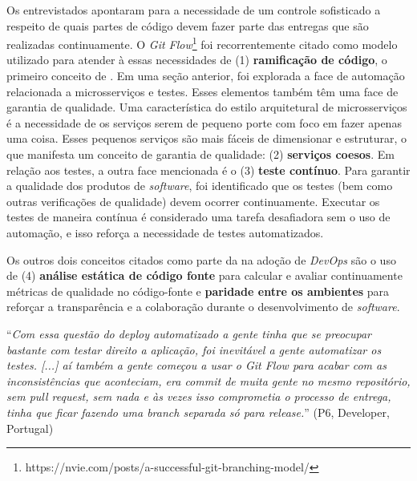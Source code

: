 Os entrevistados apontaram para a necessidade de um controle sofisticado a
respeito de quais partes de código devem fazer parte das entregas que são
realizadas continuamente. O \emph{Git Flow}\footnote{https://nvie.com/posts/a-successful-git-branching-model/}
foi recorrentemente citado como modelo utilizado para atender à essas necessidades
de (1) {\bf ramificação de código}, o primeiro conceito de . Em uma seção anterior, foi explorada a face de automação relacionada
a microsserviços e testes. Esses elementos também têm uma face de garantia de
qualidade. Uma característica do estilo arquitetural de microsserviços é a
necessidade de os serviços serem de pequeno porte com foco em fazer apenas uma coisa.
Esses pequenos serviços são mais fáceis de dimensionar e estruturar, o que
manifesta um conceito de garantia de qualidade: (2) {\bf serviços coesos}. Em
relação aos testes, a outra face mencionada é o (3) \textbf{teste contínuo}.
Para garantir a qualidade dos produtos de {\it software}, foi identificado que
os testes (bem como outras verificações de qualidade) devem ocorrer
continuamente. Executar os testes de maneira contínua é considerado uma tarefa
desafiadora sem o uso de automação, e isso reforça a necessidade de testes
automatizados.

Os outros dois conceitos citados como parte da  na
adoção de {\it DevOps} são o uso de (4) \textbf{análise estática de código
fonte} para calcular e avaliar continuamente métricas de qualidade no
código-fonte e \textbf{paridade entre os ambientes} para reforçar a
transparência e a colaboração durante o desenvolvimento de {\it software}.

\begin{mq}
``\emph{Com essa questão do deploy automatizado a gente tinha que se preocupar
bastante com testar direito a aplicação, foi inevitável a gente automatizar os
testes. [...] aí também a gente começou a usar o Git Flow para acabar com as
inconsistências que aconteciam, era commit de muita gente no mesmo repositório,
sem pull request, sem nada e às vezes isso comprometia o processo de entrega,
tinha que ficar fazendo uma branch separada só para release.}''
(P6, Developer, Portugal)
\end{mq}
